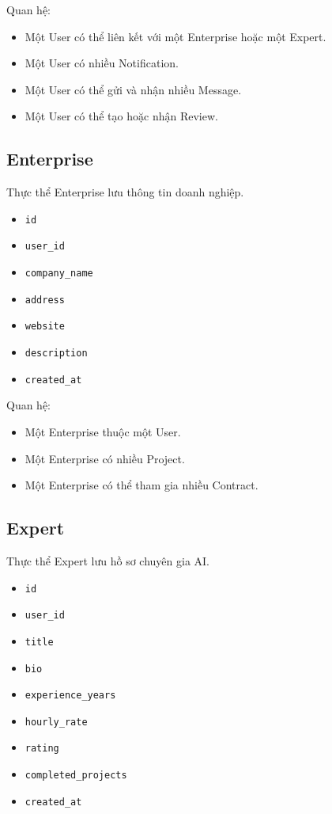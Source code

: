Quan hệ:

\begin{itemize}
    \item Một User có thể liên kết với một Enterprise hoặc một Expert.
    \item Một User có nhiều Notification.
    \item Một User có thể gửi và nhận nhiều Message.
    \item Một User có thể tạo hoặc nhận Review.
\end{itemize}

\subsection{Enterprise}

Thực thể Enterprise lưu thông tin doanh nghiệp.

\begin{itemize}
    \item \texttt{id}
    \item \texttt{user\_id}
    \item \texttt{company\_name}
    \item \texttt{address}
    \item \texttt{website}
    \item \texttt{description}
    \item \texttt{created\_at}
\end{itemize}

Quan hệ:

\begin{itemize}
    \item Một Enterprise thuộc một User.
    \item Một Enterprise có nhiều Project.
    \item Một Enterprise có thể tham gia nhiều Contract.
\end{itemize}

\subsection{Expert}

Thực thể Expert lưu hồ sơ chuyên gia AI.

\begin{itemize}
    \item \texttt{id}
    \item \texttt{user\_id}
    \item \texttt{title}
    \item \texttt{bio}
    \item \texttt{experience\_years}
    \item \texttt{hourly\_rate}
    \item \texttt{rating}
    \item \texttt{completed\_projects}
    \item \texttt{created\_at}
\end{itemize}

